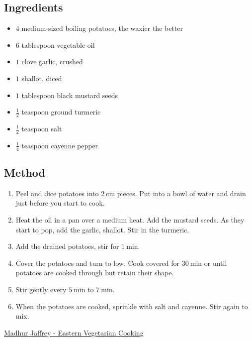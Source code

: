 \documentclass[11pt,a4paper]{article}
\begin{document}
\subsection*{Ingredients}

\begin{itemize}
  \item $ 4 $ medium-sized boiling potatoes, the waxier the better
  \item $ 6 $ tablespoon vegetable oil
  \item $ 1 $ clove garlic, crushed
  \item $ 1 $ shallot, diced
  \item $ 1 $ tablespoon black mustard seeds
  \item $ \frac{1}{2} $ teaspoon ground turmeric
  \item $ \frac{1}{2} $ teaspoon salt
  \item $ \frac{1}{4} $ teaspoon cayenne pepper
\end{itemize}

\medskip

\subsection*{Method}

\begin{enumerate}
  \item Peel and dice potatoes into $ \qty{2}{\centi\metre} $ pieces. Put into
  a bowl of water and drain just before you start to cook.
  \item Heat the oil in a pan over a medium heat. Add the mustard seeds. As
  they start to pop, add the garlic, shallot. Stir in the turmeric.
  \item Add the drained potatoes, stir for $ \qty{1}{\minute} $.
  \item Cover the potatoes and turn to low. Cook covered for $
  \qty{30}{\minute} $ or until potatoes are cooked through but retain their
  shape. 
  \item Stir gently every $ \qty{5}{\minute} $ to $ \qty{7}{\minute} $.
  \item When the potatoes are cooked, sprinkle with salt and cayenne. Stir
  again to mix.
\end{enumerate}

\href{https://ivu.org/legacy-recipes/indian-root/dry-j.html}{Madhur Jaffrey - Eastern Vegetarian Cooking}
\end{document}
